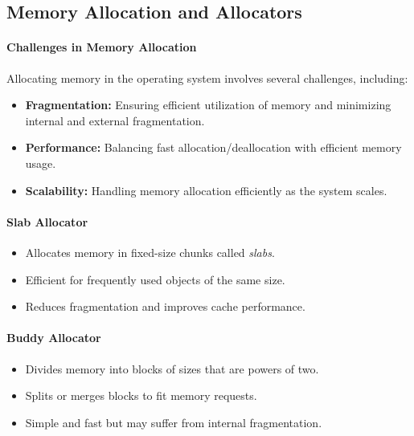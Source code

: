 \documentclass{article}
\begin{document}
\subsection{Memory Allocation and Allocators}

\paragraph{Challenges in Memory Allocation}
Allocating memory in the operating system involves several challenges, including:
\begin{itemize}
    \item \textbf{Fragmentation:} Ensuring efficient utilization of memory and minimizing internal and external fragmentation.
    \item \textbf{Performance:} Balancing fast allocation/deallocation with efficient memory usage.
    \item \textbf{Scalability:} Handling memory allocation efficiently as the system scales.
\end{itemize}

\paragraph{Slab Allocator}
\begin{itemize}
    \item Allocates memory in fixed-size chunks called \textit{slabs}.
    \item Efficient for frequently used objects of the same size.
    \item Reduces fragmentation and improves cache performance.
\end{itemize}

\paragraph{Buddy Allocator}
\begin{itemize}
    \item Divides memory into blocks of sizes that are powers of two.
    \item Splits or merges blocks to fit memory requests.
    \item Simple and fast but may suffer from internal fragmentation.
\end{itemize}









\end{document}
